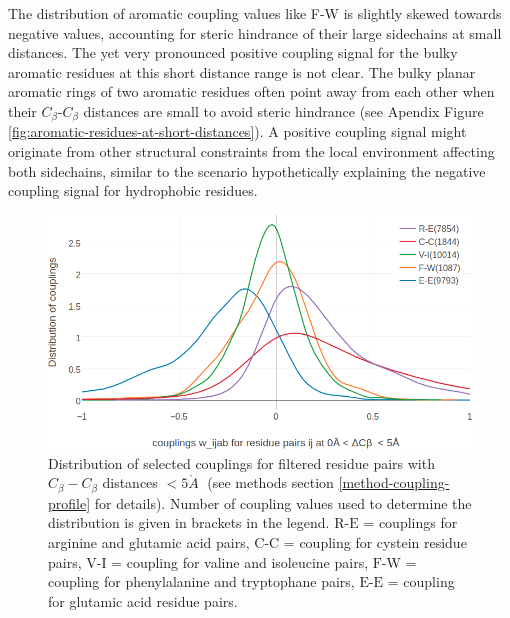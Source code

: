 \documentclass[11pt,a4paper,twoside]{book}
\newcommand{\Cb}{C_\beta}
\newcommand{\angstrom}{\mathring{A} \;}
\theoremstyle{definition}
\theoremstyle{definition}
\theoremstyle{remark}
\begin{document}
The distribution of aromatic coupling values like F-W is slightly skewed
towards negative values, accounting for steric hindrance of their large
sidechains at small distances. The yet very pronounced positive coupling
signal for the bulky aromatic residues at this short distance range is
not clear. The bulky planar aromatic rings of two aromatic residues
often point away from each other when their \(\Cb\)-\(\Cb\) distances
are small to avoid steric hindrance (see Apendix Figure
\ref{fig:aromatic-residues-at-short-distances}). A positive coupling
signal might originate from other structural constraints from the local
environment affecting both sidechains, similar to the scenario
hypothetically explaining the negative coupling signal for hydrophobic
residues.











\begin{figure}

{\centering \includegraphics[width=1\linewidth]{img/coupling_matrix_analysis/1d_coupling_profile_0_5} 

}

\caption{Distribution of selected couplings
for filtered residue pairs with \(\Cb-\Cb\) distances \(< 5\angstrom\)
(see methods section \ref{method-coupling-profile} for details). Number
of coupling values used to determine the distribution is given in
brackets in the legend. \(\text{R-E}\) = couplings for arginine and
glutamic acid pairs, \(\text{C-C}\) = coupling for cystein residue
pairs, \(\text{V-I}\) = coupling for valine and isoleucine pairs,
\(\text{F-W}\) = coupling for phenylalanine and tryptophane pairs,
\(\text{E-E}\) = coupling for glutamic acid residue pairs.}\label{fig:1d-coupling-profile-0-5}
\end{figure}
\end{document}
